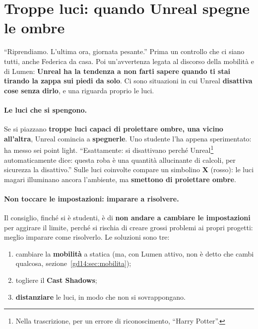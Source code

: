 \section{Troppe luci: quando Unreal spegne le ombre}
\label{gd14:sec:troppe-luci}



``Riprendiamo. L'ultima ora, giornata pesante.'' Prima un controllo che ci siano
tutti, anche Federica da casa. Poi un'avvertenza legata al discorso della mobilità
e di Lumen: \textbf{Unreal ha la tendenza a non farti sapere quando ti stai tirando
la zappa sui piedi da solo}. Ci sono situazioni in cui Unreal \textbf{disattiva cose
senza dirlo}, e una riguarda proprio le luci.

\paragraph{Le luci che si spengono.} Se si piazzano \textbf{troppe luci capaci di
proiettare ombre, una vicino all'altra}, Unreal comincia a \textbf{spegnerle}. Uno
studente l'ha appena sperimentato: ha messo sei point light. ``Esattamente: si
disattivano perché Unreal\footnote{Nella trascrizione, per un errore di
riconoscimento, ``Harry Potter''.} automaticamente dice: questa roba è una quantità
allucinante di calcoli, per sicurezza la disattivo.'' Sulle luci coinvolte compare
un simbolino \textbf{X} (rosso): le luci magari illuminano ancora l'ambiente, ma
\textbf{smettono di proiettare ombre}.

\paragraph{Non toccare le impostazioni: imparare a risolvere.} Il consiglio, finché
si è studenti, è di \textbf{non andare a cambiare le impostazioni} per aggirare il
limite, perché si rischia di creare grossi problemi ai propri progetti: meglio
imparare come risolverlo. Le soluzioni sono tre:
\begin{enumerate}
  \item cambiare la \textbf{mobilità} a statica (ma, con Lumen attivo, non è detto
        che cambi qualcosa, sezione~\ref{gd14:sec:mobilita});
  \item togliere il \textbf{Cast Shadows};
  \item \textbf{distanziare} le luci, in modo che non si sovrappongano.
\end{enumerate}

